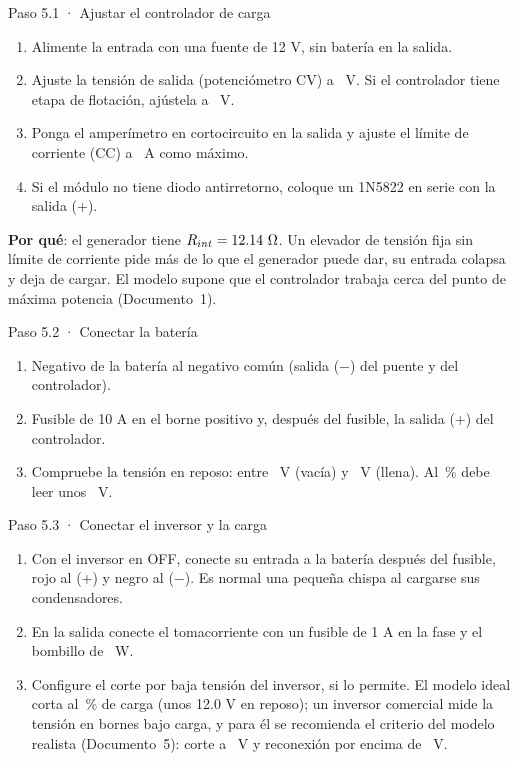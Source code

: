\documentclass[11pt]{article}
\begin{document}
\begin{paso}{Paso 5.1 · Ajustar el controlador de carga}
\begin{enumerate}
  \item Alimente la entrada con una fuente de 12 V, sin batería en la salida.
  \item Ajuste la tensión de salida (potenciómetro CV) a \ValControladorAbsorcion\ V. Si el controlador tiene etapa
        de flotación, ajústela a \ValControladorFlotacion\ V.
  \item Ponga el amperímetro en cortocircuito en la salida y ajuste el límite de corriente (CC) a
        \ValControladorCorrienteMax\ A como máximo.
  \item Si el módulo no tiene diodo antirretorno, coloque un 1N5822 en serie con la salida (+).
\end{enumerate}
\textbf{Por qué}: el generador tiene $R_{int}=12.14\ \Omega$. Un elevador de tensión fija sin límite
de corriente pide más de lo que el generador puede dar, su entrada colapsa y deja de cargar. El modelo supone
que el controlador trabaja cerca del punto de máxima potencia (Documento~1).
\end{paso}

\begin{paso}{Paso 5.2 · Conectar la batería}
\begin{enumerate}
  \item Negativo de la batería al negativo común (salida (−) del puente y del controlador).
  \item Fusible de 10 A en el borne positivo y, después del fusible, la salida (+) del controlador.
  \item Compruebe la tensión en reposo: entre \ValBateriaVacia\ V (vacía) y \ValBateriaLlena\ V (llena).
        Al \ValSocInicial\,\% debe leer unos \ValTensionOcRef\ V.
\end{enumerate}
\end{paso}

\begin{paso}{Paso 5.3 · Conectar el inversor y la carga}
\begin{enumerate}
  \item Con el inversor en OFF, conecte su entrada a la batería después del fusible, rojo al (+) y negro al (−).
        Es normal una pequeña chispa al cargarse sus condensadores.
  \item En la salida conecte el tomacorriente con un fusible de 1 A en la fase y el bombillo de
        \ValPotenciaCargaAc\ W.
  \item Configure el corte por baja tensión del inversor, si lo permite. El modelo ideal corta al \ValSocCorte\,\%
        de carga (unos 12.0 V en reposo); un inversor comercial mide la tensión en bornes bajo carga, y para él se
        recomienda el criterio del modelo realista (Documento~5): corte a \ValInversorCorte\ V y reconexión por encima
        de \ValInversorReconexion\ V.
\end{enumerate}
\end{paso}
\end{document}
